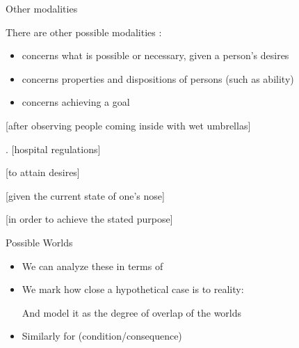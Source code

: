 \begin{frame}{Other modalities}

There are other possible modalities \citep[p290 (4)]{Kroeger:2022}:
\begin{itemize}
\item {} concerns what is possible or necessary,
given a person's desires
\item {} concerns properties and dispositions of persons (such as ability)
\item {} concerns achieving a goal
\end{itemize}

\begin{exe}
\item {}
   [after observing people coming inside with wet umbrellas] 
 \item {}.
   [hospital regulations] 
 \item {}
   [to attain desires] 
 \item {}
   [given the current state of one's nose] 
 \item {}
   [in order to achieve the stated purpose] 
\end{exe}
\end{frame}

\begin{frame}{Possible Worlds}

\begin{itemize}
\item We can analyze these in terms of 

\item We mark how close a hypothetical case is to reality:
  \begin{exe}
    \ex {}
  \end{exe}
  And model it as the degree of overlap of the worlds
\item Similarly for  (condition/consequence)
  \begin{exe}
    \ex {}
    \ex {}
    \ex {}
  \end{exe}
\end{itemize}

\end{frame}

